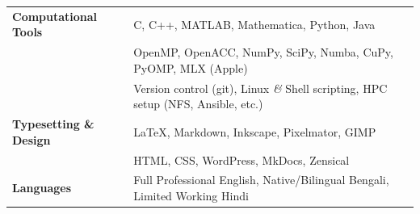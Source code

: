
\begin{longtable}[l]{@{} m{3.75cm} m{15cm}}
\textbf{Computational Tools} & C, C++, MATLAB, Mathematica, Python, Java\\
                                  & OpenMP, OpenACC, NumPy, SciPy, Numba, CuPy, PyOMP, MLX (Apple)\\
                                  & Version control (git), Linux \textit{\&} Shell scripting, HPC setup (NFS, Ansible, etc.)\\[0.15cm]

\textbf{Typesetting \& Design}  & \LaTeX, Markdown, Inkscape, Pixelmator, GIMP\\
                                  & HTML, CSS, WordPress, MkDocs, Zensical \\[0.15cm]

\textbf{Languages} & Full Professional English, Native/Bilingual Bengali,  Limited Working Hindi\\
\end{longtable}